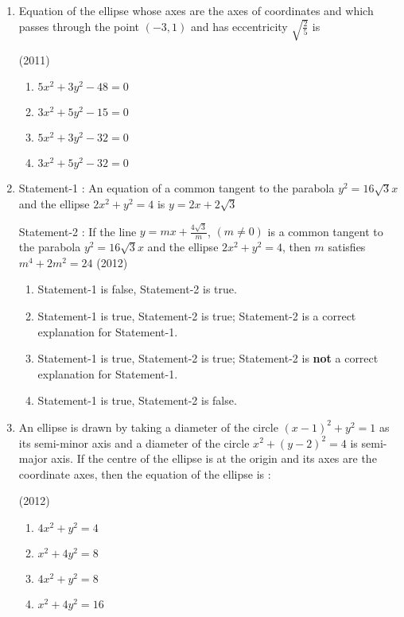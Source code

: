 \documentclass[journal,12pt,twocolumn]{IEEEtran}
\theoremstyle{remark}
\begin{document}
\begin{enumerate}
    \item Equation of the ellipse whose axes are the axes of coordinates and which passes through the point $(-3,1)$ and has eccentricity $\sqrt{\frac{2}{5}}$ is
    
    \hfill(2011)
    
    \begin{enumerate}[label=(\alph*)]
    \item$5x^2+3y^2-48=0$
    \item$3x^2+5y^2-15=0$
    \item$5x^2+3y^2-32=0$ 
    \item$3x^2+5y^2-32=0$ \\
    \end{enumerate}

    \item
    Statement-1 : An equation of a common tangent to the parabola $y^2=16\sqrt{3}x$ and the ellipse $2x^2+y^2=4$ is $y=2x+2\sqrt{3}$
    
    Statement-2 : If the line $y=mx+\frac{4\sqrt{3}}{m}$, $(m\neq0)$ is a common tangent to the parabola $y^2=16\sqrt{3}x$ and the ellipse $2x^2+y^2=4$, then $m$ satisfies $m^4+2m^2=24$ 
    \hfill(2012)
    \begin{enumerate}[label=(\alph*)]
    \item Statement-1 is false, Statement-2 is true.
    \item Statement-1 is true, Statement-2 is true; Statement-2 is a correct explanation for Statement-1.
    \item Statement-1 is true, Statement-2 is true; Statement-2 is \textbf{not} a correct explanation for Statement-1.
    \item Statement-1 is true, Statement-2 is false.\\
    \end{enumerate}
    \item An ellipse is drawn by taking a diameter of the circle $(x-1)^2+y^2=1$ as its semi-minor axis and a diameter of the circle $x^2+(y-2)^2=4$ is semi-major axis. If the centre of the ellipse is at the origin and its axes are the coordinate axes, then the equation of the ellipse is : 
   
    \hfill(2012)
    
    \begin{enumerate}[label=(\alph*)]
    \item$4x^2+y^2=4$
    \item$x^2+4y^2=8$
    \item$4x^2+y^2=8$
    \item$x^2+4y^2=16$ \\
    \end{enumerate}


\end{enumerate}
\end{document}
